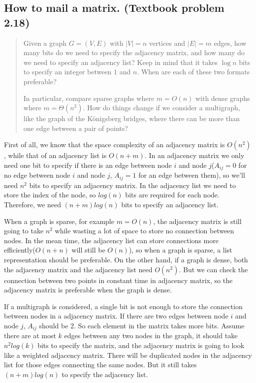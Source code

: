 
\subsection*{How to mail a matrix. (Textbook problem 2.18)}
    \begin{quote}
    Given a graph $G = (V, E)$ with $|V| = n$ vertices and $|E| = m$ edges, how many bits do we need to specify the adjacency matrix, and how many do we need to specify an adjacency list? Keep in mind that it takes $\log n$ bits to specify an integer between $1$ and $n$. When are each of these two formats preferable?

    In particular, compare sparse graphs where $m = O(n)$ with dense graphs where $m = \Theta(n^2)$. How do things change if we consider a multigraph, like the graph of the K\"{o}nigsberg bridges, where there can be more than one edge between a pair of points?
    \end{quote}

    \begin{solution}
        
        First of all, we know that the space complexity of an adjacency matrix is $O(n^2)$, while that of an adjacency list is $O(n+m)$. In an adjacency matrix we only need one bit to specify if there is an edge between node $i$ and node $j$($A_{ij} = 0$ for no edge between node $i$ and node $j$, $A_{ij} = 1$ for an edge between them), so we'll need $n^2$ bits to specify an adjacency matrix. In the adjacency list we need to store the index of the node, so $log(n)$ bits are required for each node. Therefore, we need $(n+m)log(n)$ bits to specify an adjacency list.
        
        When a graph is sparse, for example $m = O(n)$, the adjacency matrix is still going to take $n^2$ while wasting a lot of space to store no connection between nodes. In the mean time, the adjacency list can store connections more efficiently($O(n+n)$ will still be $O(n)$), so when a graph is sparse, a list representation should be preferable. On the other hand, if a graph is dense, both the adjacency matrix and the adjacency list need $O(n^2)$. But we can check the connection between two points in constant time in adjacency matrix, so the adjacency matrix is preferable when the graph is dense.
        
        If a multigraph is considered, a single bit is not enough to store the connection between nodes in a adjacency matrix. If there are two edges between node $i$ and node $j$, $A_{ij}$ should be 2. So each element in the matrix takes more bits. Assume there are at most $k$ edges between any two nodes in the graph, it should take $n^2log(k)$ bits to specify the matrix, and the adjacency matrix is going to look like a weighted adjacency matrix. There will be duplicated nodes in the adjacency list for those edges connecting the same nodes. But it still takes $(n+m)log(n)$ to specify the adjacency list.
        
    \end{solution}